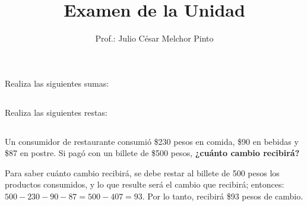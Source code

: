 \documentclass[12pt,addpoints]{evalua}
\title{Examen de la Unidad}
\author{Prof.: Julio César Melchor Pinto}
\begin{document}
\begin{questions}
    \section*{\else{}\fi}
    \subsection*{\else{}\fi}
    \question[10] Realiza las siguientes sumas:
    \begin{multicols}{2}
    \end{multicols}

    \subsection*{\else{}\fi}
    \question[8] Realiza las siguientes restas:
    \begin{multicols}{2}
    \end{multicols}

    \subsection*{\else{}\fi}
    \question[10] Un consumidor de restaurante consumió \$230 pesos en comida, \$90 en bebidas y \$87 en postre. Si pagó con un billete de \$500 pesos, \textbf{¿cuánto cambio recibirá?}
    \begin{solutionbox}{2.5cm}
        Para saber cuánto cambio recibirá, se debe restar al billete de 500 pesos los productos consumidos, y lo que resulte será el cambio que recibirá; entonces: $500-230-90-87= 500-407=93$.
        Por lo tanto, recibirá \$93 pesos de cambio.
    \end{solutionbox}


\end{questions}
\end{document}
